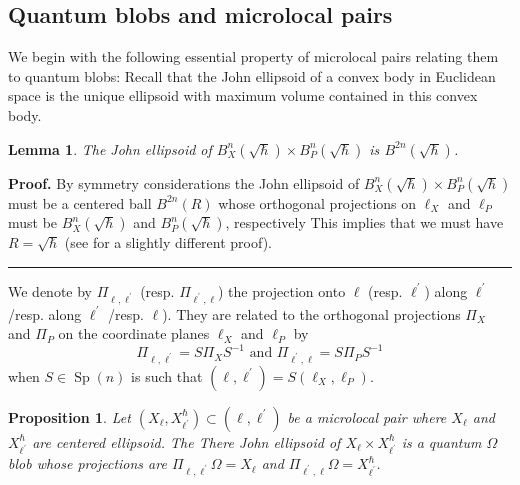 \documentclass[11pt]{article}%
\newtheorem{lemma}[theorem]{Lemma}
\newtheorem{proposition}[theorem]{Proposition}
\newenvironment{proof}[1][Proof]{\noindent\textbf{#1.} }{\ \rule{0.5em}{0.5em}}
\begin{document}
\subsection{Quantum blobs and microlocal pairs}

We begin with the following essential property of microlocal pairs relating
them to quantum blobs: Recall that the John ellipsoid \cite{Ball} of a convex
body in Euclidean space is the unique ellipsoid with maximum volume contained
in this convex body.

\begin{lemma}
\label{Lemma John}The John ellipsoid of $B_{X}^{n}(\sqrt{\hbar})\times
B_{P}^{n}(\sqrt{\hbar})$ is $B^{2n}(\sqrt{\hbar})$.
\end{lemma}

\begin{proof}
By symmetry considerations the John ellipsoid of $B_{X}^{n}(\sqrt{\hbar
})\times B_{P}^{n}(\sqrt{\hbar})$ must be a centered ball $B^{2n}(R)$ whose
orthogonal projections on $\ell_{X}$ and $\ell_{P}$ must be $B_{X}^{n}%
(\sqrt{\hbar})$ and $B_{P}^{n}(\sqrt{\hbar})$, respectively This implies that
we must have $R=\sqrt{\hbar}$ (see \cite{BSM} for a slightly different proof).
\end{proof}

We denote by $\Pi_{\ell,\ell^{\prime}}$ (resp. $\Pi_{\ell^{\prime},\ell}$) the
projection onto $\ell$ (resp. $\ell^{\prime}$) along $\ell^{\prime}$ /resp.
along $\ell^{\prime}$ /resp. $\ell$). They are related to the orthogonal
projections $\Pi_{X}$ and $\Pi_{P}$ on the coordinate planes $\ell_{X}$ and
$\ell_{P}$ by%
\begin{equation}
\Pi_{\ell,\ell^{\prime}}=S\Pi_{X}S^{-1}\text{ \ and \ }\Pi_{\ell^{\prime}%
,\ell}=S\Pi_{P}S^{-1} \label{projs}%
\end{equation}
when $S\in\operatorname*{Sp}(n)$ is such that $(\ell,\ell^{\prime})=S(\ell
_{X},\ell_{P}).$

\begin{proposition}
\label{Thm2}Let $(X_{\ell},X_{\ell^{\prime}}^{\hbar})\subset(\ell,\ell
^{\prime})$ be a microlocal pair where $X_{\ell}$ and $X_{\ell^{\prime}%
}^{\hbar}$ are centered ellipsoid. The There John ellipsoid of $X_{\ell}\times
X_{\ell^{\prime}}^{\hbar}$ is a quantum $\Omega$ blob whose projections are
$\Pi_{\ell,\ell^{\prime}}\Omega=X_{\ell}$ and $\Pi_{\ell^{\prime},\ell}%
\Omega=X_{\ell^{\prime}}^{\hbar}$.
\end{proposition}
\end{document}
